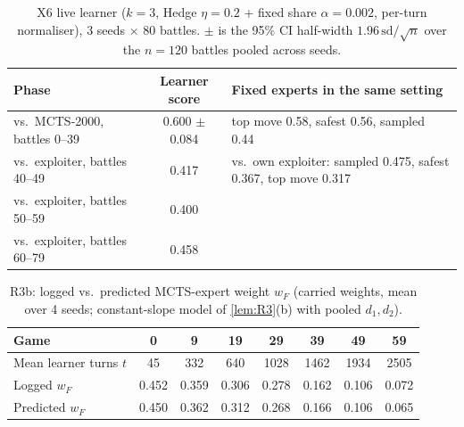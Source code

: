 \documentclass[10pt]{article}
\theoremstyle{plain}
\theoremstyle{definition}
\theoremstyle{remark}
\begin{document}
\begin{table}[h]
\centering\small
\caption{X6 live learner ($k=3$, Hedge $\eta=0.2$ + fixed share $\alpha=0.002$, per-turn normaliser), 3 seeds $\times$ 80 battles. $\pm$ is the 95\% CI half-width $1.96\,\mathrm{sd}/\sqrt n$ over the $n=120$ battles pooled across seeds.}
\label{tab:x6}
\begin{tabular}{@{}lcl@{}}
\toprule
Phase & Learner score & Fixed experts in the same setting \\
\midrule
vs.\ MCTS-2000, battles 0--39 & 0.600 $\pm$ 0.084 & top move 0.58, safest 0.56, sampled 0.44 \\
vs.\ exploiter, battles 40--49 & 0.417 & vs.\ own exploiter: sampled 0.475, safest 0.367, top move 0.317 \\
vs.\ exploiter, battles 50--59 & 0.400 & \\
vs.\ exploiter, battles 60--79 & 0.458 & \\
\bottomrule
\end{tabular}
\end{table}

\begin{table}[h]
\centering\small
\caption{R3b: logged vs.\ predicted MCTS-expert weight $w_F$ (carried weights, mean over 4 seeds; constant-slope model of \cref{lem:R3}(b) with pooled $d_1,d_2$).}
\label{tab:r3b}
\begin{tabular}{@{}lccccccc@{}}
\toprule
Game & 0 & 9 & 19 & 29 & 39 & 49 & 59 \\
\midrule
Mean learner turns $t$ & 45 & 332 & 640 & 1028 & 1462 & 1934 & 2505 \\
Logged $w_F$ & 0.452 & 0.359 & 0.306 & 0.278 & 0.162 & 0.106 & 0.072 \\
Predicted $w_F$ & 0.450 & 0.362 & 0.312 & 0.268 & 0.166 & 0.106 & 0.065 \\
\bottomrule
\end{tabular}
\end{table}
\end{document}

